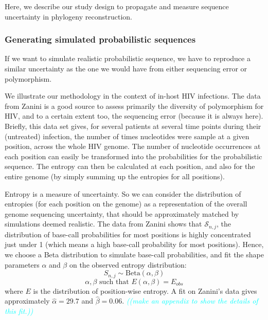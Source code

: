 \documentclass[10pt]{article}
\newcommand{\comment}[1]{\textsl{\textcolor{cyan}{((#1))}}}
\newcommand{\betadist}[1]{\mathrm{Beta}\left(#1\right)}
\newcommand{\nps}{\mathcal{S}} %
\begin{document}
Here, we describe our study design to propagate and measure sequence uncertainty in phylogeny reconstruction. 


\subsubsection{Generating simulated probabilistic sequences} 
\label{sec:zanini_poly}

If we want to simulate realistic probabilistic sequence, we have to reproduce a similar uncertainty as the one we would have from either sequencing error or polymorphism. 

We illustrate our methodology in the context of in-host HIV infections. 
The data from Zanini \cite{Zanini:2015} is a good source to assess primarily the diversity of polymorphism for HIV, and to a certain extent too, the sequencing error (because it is always here). 
Briefly, this data set gives, for several patients at several time points during their (untreated) infection, the number of times nucleotides were sample at a given position, across the whole HIV genome. 
The number of nucleotide occurrences at each position can easily be transformed into the probabilities for the probabilistic sequence. The entropy can then be calculated at each position, and also for the entire genome (by simply summing up the entropies for all positions). 

Entropy is a measure of uncertainty. So we can consider the distribution of entropies (for each position on the genome) as a representation of the overall genome sequencing uncertainty, that should be approximately matched by simulations deemed realistic. 
The data from Zanini shows that $\nps_{n,j}$, the distribution of base-call probabilities for most positions is highly concentrated just under 1 (which means a high base-call probability for most positions). 
Hence, we choose a Beta distribution to simulate base-call probabilities, and fit the shape parameters $\alpha$ and $\beta$ on the observed entropy distribution:
\begin{equation}
\label{eq:beta_sampling}
S_{n,j} \sim \betadist{\alpha, \beta}
\end{equation}
\begin{equation}
\alpha, \beta \text{ such that } E(\alpha,\beta) = E_{obs}
\end{equation}
where $E$ is the distribution of position-wise entropy.
A fit on Zanini's data \cite{Zanini:2015} gives approximately $\hat{\alpha} = 29.7$ and $\hat{\beta} = 0.06$. \comment{make an appendix to show the details of this fit.}
\end{document}
